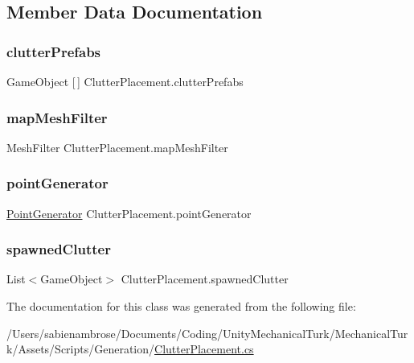 \subsection{Member Data Documentation}
\mbox{\label{class_clutter_placement_a0438378166fab8abdbb483d4252e181f}} 
\subsubsection{\texorpdfstring{clutter\+Prefabs}{clutterPrefabs}}
{\footnotesize\ttfamily Game\+Object \mbox{[}$\,$\mbox{]} Clutter\+Placement.\+clutter\+Prefabs}

\mbox{\label{class_clutter_placement_a28d25417ea666507f5a68e5c789ac903}} 
\subsubsection{\texorpdfstring{map\+Mesh\+Filter}{mapMeshFilter}}
{\footnotesize\ttfamily Mesh\+Filter Clutter\+Placement.\+map\+Mesh\+Filter}

\mbox{\label{class_clutter_placement_a954b2af9e4dcc7ffe61b63c9f1b7a873}} 
\subsubsection{\texorpdfstring{point\+Generator}{pointGenerator}}
{\footnotesize\ttfamily \mbox{\hyperlink{class_point_generator}{Point\+Generator}} Clutter\+Placement.\+point\+Generator}

\mbox{\label{class_clutter_placement_ad9f568266937efd7a7938371c7179e4a}} 
\subsubsection{\texorpdfstring{spawned\+Clutter}{spawnedClutter}}
{\footnotesize\ttfamily List$<$Game\+Object$>$ Clutter\+Placement.\+spawned\+Clutter}



The documentation for this class was generated from the following file\+:\begin{DoxyCompactItemize}
\item 
/\+Users/sabienambrose/\+Documents/\+Coding/\+Unity\+Mechanical\+Turk/\+Mechanical\+Turk/\+Assets/\+Scripts/\+Generation/\mbox{\hyperlink{_clutter_placement_8cs}{Clutter\+Placement.\+cs}}\end{DoxyCompactItemize}

